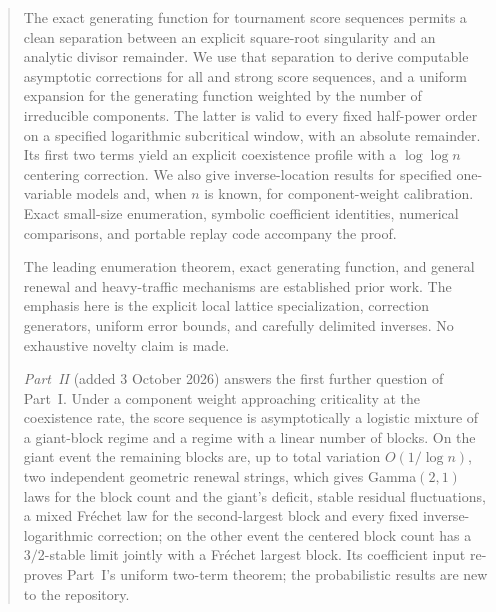 \documentclass[11pt]{article}
\theoremstyle{remark}\newtheorem{remark}[theorem]{Remark}
\theoremstyle{definition}\newtheorem{definition}[theorem]{Definition}
\begin{document}
\begin{abstract}
The exact generating function for tournament score sequences permits a clean separation between an explicit square-root singularity and an analytic divisor remainder. We use that separation to derive computable asymptotic corrections for all and strong score sequences, and a uniform expansion for the generating function weighted by the number of irreducible components. The latter is valid to every fixed half-power order on a specified logarithmic subcritical window, with an absolute remainder. Its first two terms yield an explicit coexistence profile with a $\log\log n$ centering correction. We also give inverse-location results for specified one-variable models and, when $n$ is known, for component-weight calibration. Exact small-size enumeration, symbolic coefficient identities, numerical comparisons, and portable replay code accompany the proof.

The leading enumeration theorem, exact generating function, and general renewal and heavy-traffic mechanisms are established prior work. The emphasis here is the explicit local lattice specialization, correction generators, uniform error bounds, and carefully delimited inverses. No exhaustive novelty claim is made.

\emph{Part~II} (added 3 October 2026) answers the first further question of Part~I. Under a component weight approaching criticality at the coexistence rate, the score sequence is asymptotically a logistic mixture of a giant-block regime and a regime with a linear number of blocks. On the giant event the remaining blocks are, up to total variation $O(1/\log n)$, two independent geometric renewal strings, which gives Gamma$(2,1)$ laws for the block count and the giant's deficit, stable residual fluctuations, a mixed Fr\'echet law for the second-largest block and every fixed inverse-logarithmic correction; on the other event the centered block count has a $3/2$-stable limit jointly with a Fr\'echet largest block. Its coefficient input re-proves Part~I's uniform two-term theorem; the probabilistic results are new to the repository.


\end{abstract}
\end{document}
